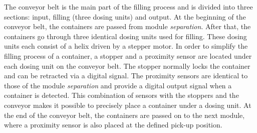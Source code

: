     
    The conveyor belt is the main part of the filling process and is divided into three sections: input, filling (three dosing units) and output. At the beginning of the conveyor belt, the containers are passed from module \textit{separation}. After that, the containers go through three identical dosing units used for filling. These dosing units each consist of a helix driven by a stepper motor. In order to simplify the filling process of a container, a stopper and a proximity sensor are located under each dosing unit on the conveyor belt. The stopper normally locks the container and can be retracted via a digital signal. The proximity sensors are identical to those of the module \textit{separation} and provide a digital output signal when a container is detected. This combination of sensors with the stoppers and the conveyor makes it possible to precisely place a container under a dosing unit. At the end of the conveyor belt, the containers are passed on to the next module, where a proximity sensor is also placed at the defined pick-up position. \\
    
